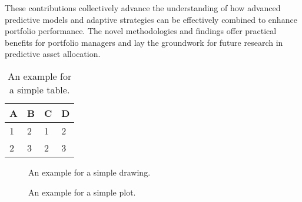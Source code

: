 These contributions collectively advance the understanding of how advanced predictive models and adaptive strategies can be effectively combined to enhance portfolio performance. The novel methodologies and findings offer practical benefits for portfolio managers and lay the groundwork for future research in predictive asset allocation.




\begin{table}[htpb]
  \caption[Example table]{An example for a simple table.}
  \centering
  \begin{tabular}{l l l l}
    \toprule
      A & B & C & D \\
    \midrule
      1 & 2 & 1 & 2 \\
      2 & 3 & 2 & 3 \\
    \bottomrule
  \end{tabular}
\end{table}

\begin{figure}[htpb]
  \centering
  \caption[Example drawing]{An example for a simple drawing.}
\end{figure}

\begin{figure}[htpb]
  \centering

  \exampleA
  \exampleB
  \caption[Example plot]{An example for a simple plot.}
\end{figure}

